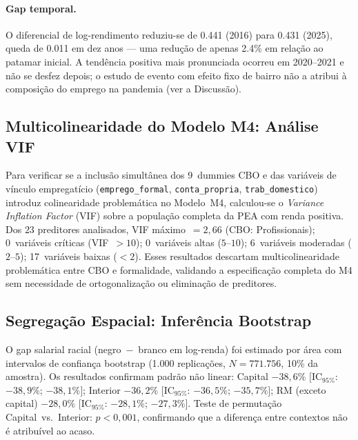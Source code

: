 \documentclass[12pt, a4paper, oneside]{article}
\begin{document}
\paragraph{Gap temporal.}
O diferencial de log-rendimento reduziu-se de 0.441 (2016)
para 0.431 (2025), queda de 0.011
em dez anos --- uma redução de apenas 2.4\%
em relação ao patamar inicial. A tendência positiva mais pronunciada
ocorreu em 2020--2021 e não se desfez depois; o estudo de evento com
efeito fixo de bairro não a atribui à composição do emprego na pandemia
(ver a Discussão).

\subsection{Multicolinearidade do Modelo M4: Análise VIF}
\label{subsec:vif}

Para verificar se a inclusão simultânea dos 9~dummies
CBO e das variáveis de vínculo empregatício (\texttt{emprego\_formal},
\texttt{conta\_propria}, \texttt{trab\_domestico}) introduz colinearidade
problemática no Modelo~M4, calculou-se o \textit{Variance Inflation Factor} (VIF)
sobre a população completa da PEA com renda positiva.
Dos $23$ preditores analisados, VIF máximo~$= 2,66$
(CBO: Profissionais); 0~variáveis críticas
(VIF~$> 10$); 0~variáveis altas ($5$--$10$);
6~variáveis moderadas ($2$--$5$);
17~variáveis baixas ($< 2$).
Esses resultados descartam multicolinearidade problemática entre CBO e
formalidade, validando a especificação completa do M4 sem necessidade de
ortogonalização ou eliminação de preditores.

\subsection{Segregação Espacial: Inferência Bootstrap}
\label{subsec:segr_ci}

O gap salarial racial (negro~$-$~branco em log-renda) foi estimado por
área com intervalos de confiança bootstrap (1.000 replicações,
$N=771.756$, 10\% da amostra). Os resultados confirmam padrão não linear:
Capital $−38,6\%$
$[\text{IC}_{95\%}$: $−38,9\%$;
$−38,1\%]$;
Interior $−36,2\%$
$[\text{IC}_{95\%}$: $−36,5\%$;
$−35,7\%]$;
RM (exceto capital) $−28,0\%$
$[\text{IC}_{95\%}$: $−28,1\%$;
$−27,3\%]$.
Teste de permutação Capital~vs.~Interior: $p < 0{,}001$, confirmando que
a diferença entre contextos não é atribuível ao acaso.

\end{document}
